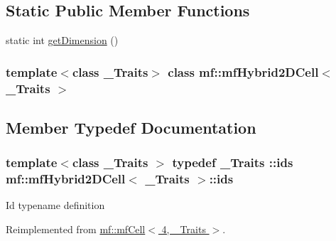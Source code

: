 \subsection*{Static Public Member Functions}
\begin{DoxyCompactItemize}
\item 
static int \hyperlink{classmf_1_1mfHybrid2DCell_a93668aada55d3779cfadd32c068eb5e2}{getDimension} ()
\end{DoxyCompactItemize}
\subsubsection*{template$<$class \_\-Traits$>$ class mf::mfHybrid2DCell$<$ \_\-Traits $>$}



\subsection{Member Typedef Documentation}
\hypertarget{classmf_1_1mfHybrid2DCell_a0ee11399531818ab7eac9c5fede19b14}{
\subsubsection[{ids}]{\setlength{\rightskip}{0pt plus 5cm}template$<$class \_\-Traits $>$ typedef \_\-Traits ::{\bf ids} {\bf mf::mfHybrid2DCell}$<$ \_\-Traits $>$::{\bf ids}}}
\label{classmf_1_1mfHybrid2DCell_a0ee11399531818ab7eac9c5fede19b14}
Id typename definition 

Reimplemented from \hyperlink{classmf_1_1mfCell_a9e32102899fb1e6b5e95b08a6c71063f}{mf::mfCell$<$ 4, \_\-Traits $>$}.



